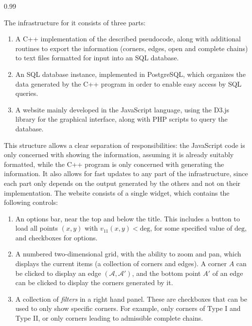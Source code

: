 \documentclass[reqno,a4paper,twoside]{amsart}
\theoremstyle{definition}
\theoremstyle{remark}
\begin{document}
\begin{spacing}{0.99}
\smallskip

The infrastructure for it consists of three parts:

\begin{enumerate}[itemsep=0.5ex,topsep=0.5ex]

\item A C++ implementation of the described pseudocode, along with additional routines to export the information (corners, edges, open and complete chains) to text files formatted for input into an SQL database.

\item An SQL database instance, implemented in PostgreSQL, which organizes the data generated by the C++ program in order to enable easy access by SQL queries.

\item A website mainly developed in the JavaScript language, using the D3.js library for the graphical interface, along with PHP scripts to query the database.

\end{enumerate}
This structure allows a clear separation of responsibilities: the JavaScript code is only concerned with showing the information, assuming it is already suitably formatted, while the C++ program is only concerned with generating the information. It also allows for fast updates to any part of the infrastructure, since each part only depends on the output generated by the others and not on their implementation.
The website consists of a single widget, which contains the following controls:

\begin{enumerate}[itemsep=0.5ex,topsep=0.5ex]

\item An options bar, near the top and below the title. This includes a button to load all points $(x,y)$ with $v_{11}(x,y) < \text{deg}$, for some specified value of $\text{deg}$, and checkboxes for options.

\item A numbered two-dimensional grid, with the ability to zoom and pan, which displays the current items (a collection of corners and edges). A corner $A$ can be clicked to display an edge $(\mathcal{A},\mathcal{A}')$, and the bottom point $A'$ of an edge can be clicked to display the corners generated by it.

\item A collection of \textit{filters} in a right hand panel. These are checkboxes that can be used to only show specific corners. For example, only corners of Type I and Type II, or only corners leading to admissible complete chains.


\end{enumerate}
\end{spacing}
\end{document}
